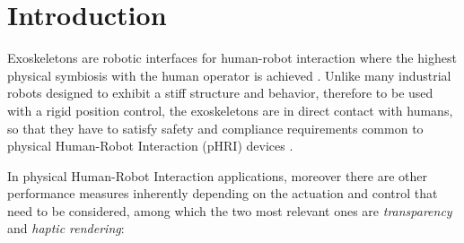 \section{Introduction}

Exoskeletons are robotic interfaces for human-robot interaction where the highest physical symbiosis with the human operator is achieved 
\cite{Frisoli2019Encylopedia}.
Unlike many industrial robots  designed to exhibit a stiff structure and behavior,  therefore to be used with a rigid position control, the exoskeletons are in direct contact with humans, so that  they have to satisfy  safety and compliance requirements common to physical Human-Robot Interaction (pHRI) devices \cite{bajcsy2017learning}.
\par In physical Human-Robot Interaction applications, moreover  there are other performance measures inherently depending on the actuation and control that need to be considered, among which the two most relevant ones are {\em transparency} and  {\em haptic rendering}: 

%
	
